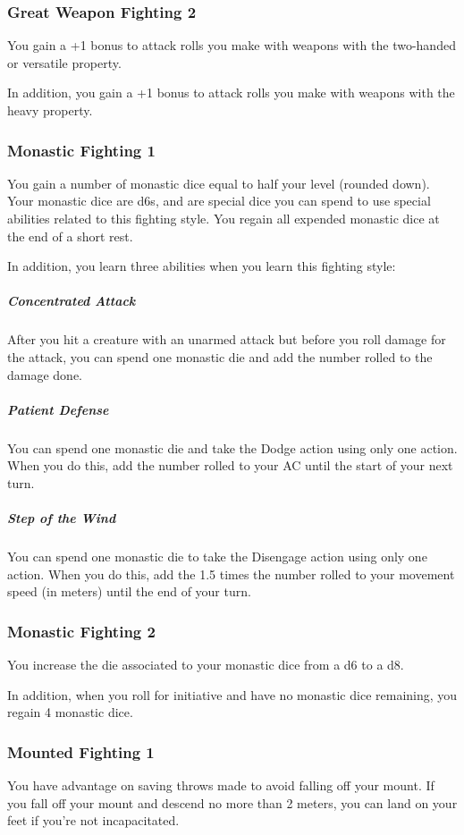     \subsubsection{Great Weapon Fighting 2}
        You gain a +1 bonus to attack rolls you make with weapons with the two-handed or versatile property.

        In addition, you gain a +1 bonus to attack rolls you make with weapons with the heavy property.
    \subsubsection{Monastic Fighting 1}
        You gain a number of monastic dice equal to half your level (rounded down).
        Your monastic dice are d6s, and are special dice you can spend to use special abilities related to this fighting style.
        You regain all expended monastic dice at the end of a short rest.

        In addition, you learn three abilities when you learn this fighting style:
        \subparagraph{Concentrated Attack} After you hit a creature with an unarmed attack but before you roll damage for the attack, you can spend one monastic die and add the number rolled to the damage done.
        \subparagraph{Patient Defense} You can spend one monastic die and take the Dodge action using only one action.
        When you do this, add the number rolled to your AC until the start of your next turn.
        \subparagraph{Step of the Wind} You can spend one monastic die to take the Disengage action using only one action.
        When you do this, add the 1.5 times the number rolled to your movement speed (in meters) until the end of your turn.
    \subsubsection{Monastic Fighting 2}
        You increase the die associated to your monastic dice from a d6 to a d8.

        In addition, when you roll for initiative and have no monastic dice remaining, you regain 4 monastic dice.
    \subsubsection{Mounted Fighting 1}
        You have advantage on saving throws made to avoid falling off your mount.
        If you fall off your mount and descend no more than 2 meters, you can land on your feet if you're not incapacitated.

